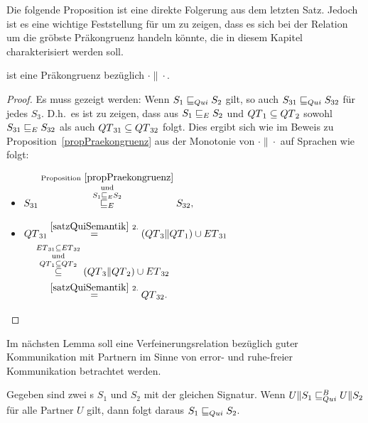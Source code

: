 Die folgende Proposition ist eine direkte Folgerung aus dem letzten Satz.
Jedoch ist es eine wichtige Feststellung für um zu zeigen, dass es sich bei der
Relation \QRel{} um die gröbste Präkongruenz handeln könnte, die in diesem
Kapitel charakterisiert werden soll.

\begin{prop}
\label{propQuiPrae}
  \QRel{} ist eine Präkongruenz bezüglich $\cdot\|\cdot$.
\end{prop}

\begin{proof}
  Es muss gezeigt werden: Wenn $S_1\sqsubseteq _{Qui} S_2$ gilt, so auch
  $S_{31}\sqsubseteq _{Qui} S_{32}$ für jedes $S_3$. D.h.\ es ist zu zeigen, dass aus
  $S_1\sqsubseteq _E S_2$ und $QT{}_1\subseteq QT{}_2$ sowohl $S_{31}\sqsubseteq _E S_{32}$ als
  auch $QT{}_{31}\subseteq QT{}_{32}$ folgt. Dies ergibt sich wie im Beweis
  zu Proposition~\ref{propPraekongruenz} aus der Monotonie von $\cdot\|\cdot$
  auf Sprachen wie folgt:
  \begin{itemize}
    \item $\begin{aligned}[t]
        S_{31} \overset{\mathrm{Proposition}
        ~\ref{propPraekongruenz}}{\overset{\mathrm{und}}{\overset{S_1\sqsubseteq _E
    S_2}{\sqsubseteq _E}}} S_{32},
    \end{aligned}$
    \item $\begin{aligned}[t]
        \QT{}_{31} &\overset{\ref{satzQuiSemantik}~2.}{=}
        (\QT{}_3\|\QT{}_1)\cup \ET{}_{31}\\
        &\hspace{-0.5cm}\overset{\ET{}_{31}\subseteq
      \ET{}_{32}}{\overset{\mathrm{und}}{\overset{\QT{}_1\subseteq
      \QT{}_2}{\subseteq}}} (\QT{}_3\|\QT{}_2) \cup \ET{}_{32}\\
        &\overset{\ref{satzQuiSemantik}~2.}{=} \QT{}_{32}.
    \end{aligned}$
  \end{itemize}
\end{proof}

Im nächsten Lemma soll eine Verfeinerungsrelation bezüglich guter Kommunikation
mit Partnern im Sinne von error- und ruhe-freier Kommunikation betrachtet
werden.

\begin{lem}
\label{lemQuiVerfeinerung}
  Gegeben sind zwei \EIO{}s $S_1$ und $S_2$ mit der gleichen Signatur. Wenn
  $U\|S_1\sqsubseteq _{Qui}^B U\|S_2$ für alle Partner $U$ gilt, dann folgt daraus $S_1\sqsubseteq _{Qui}
  S_2$.
\end{lem}

